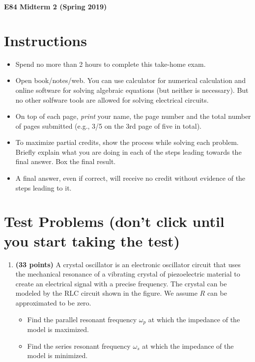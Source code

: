 \usepackage{html}

\begin{center}
{\Large \bf E84 Midterm 2 (Spring 2019)}
\end{center}
\begin{enumerate}


\section*{Instructions}

\begin{itemize}
\item Spend no more than 2 hours to complete this take-home exam.
\item Open book/notes/web. You can use calculator for numerical
  calculation and online software for solving algebraic equations 
  (but neither is necessary). But no other solfware tools are allowed 
  for solving electrical circuits.
\item On top of each page, {\em print} your name, the page number
  and the total number of pages submitted (e.g., 3/5 on the 3rd page
  of five in total).
\item To maximize partial credits, show the process while solving
  each problem. Briefly explain what you are doing in each of the
  steps leading towards the final answer. Box the final result. 
\item A final answer, even if correct, will receive no credit
  without evidence of the steps leading to it.
\end{itemize}


\section*{Test Problems (don't click until you start taking the test)}

\begin{enumerate}

\item {\bf (33 points)} 
  A crystal oscillator is an electronic oscillator circuit that uses
  the mechanical resonance of a vibrating crystal of piezoelectric material
  to create an electrical signal with a precise frequency. The crystal can
  be modeled by the RLC circuit shown in the figure. We assume $R$ can be
  approximated to be zero.
  \begin{itemize}
    \item Find the parallel resonant frequency $\omega_p$ at which the 
      impedance of the model is maximized.    
    \item Find the series resonant frequency $\omega_s$ at which the 
      impedance of the model is minimized.
  \end{itemize}


\end{enumerate}
\end{enumerate}
